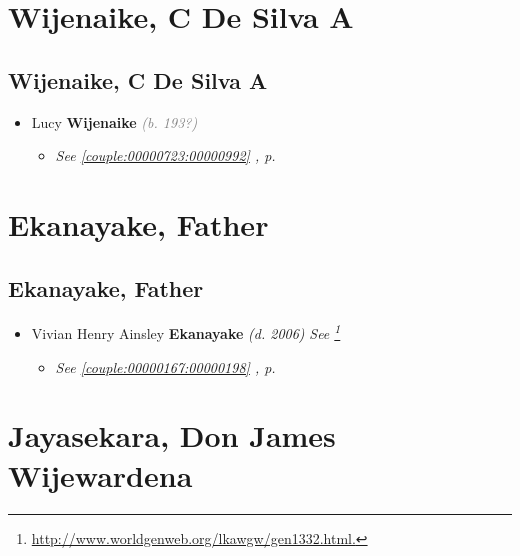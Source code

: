 \documentclass[10pt, openany]{book}
\begin{document}
\part{Wijenaike, C De Silva A}
\chapter{Wijenaike, C De Silva A}
\label{00002527}
\textcolor{slmaroon}{\textit{}}
\begin{itemize}
\item{Lucy \textbf{Wijenaike} \textcolor{gray}{\textit{(b. 193?)}}
\begin{itemize}
\item{\textcolor{slteal}{\textit{See  \autoref{couple:00000723:00000992} \textit{, p. \pageref{couple:00000723:00000992} }}}}
\end{itemize}
 }
\end{itemize}
    
\part{Ekanayake, Father}
\chapter{Ekanayake, Father}
\label{00002547}
\textcolor{slmaroon}{\textit{}}
\begin{itemize}
\item{Vivian Henry Ainsley \textbf{Ekanayake} \textcolor{slorange}{\textit{(d. 2006)}} \textcolor{slmaroon}{\textit{See \footnote{\url{http://www.worldgenweb.org/lkawgw/gen1332.html.}}}}
\begin{itemize}
\item{\textcolor{slteal}{\textit{See  \autoref{couple:00000167:00000198} \textit{, p. \pageref{couple:00000167:00000198} }}}}
\end{itemize}
   }
\end{itemize}
 
\part{Jayasekara, Don James Wijewardena}
\end{document}
